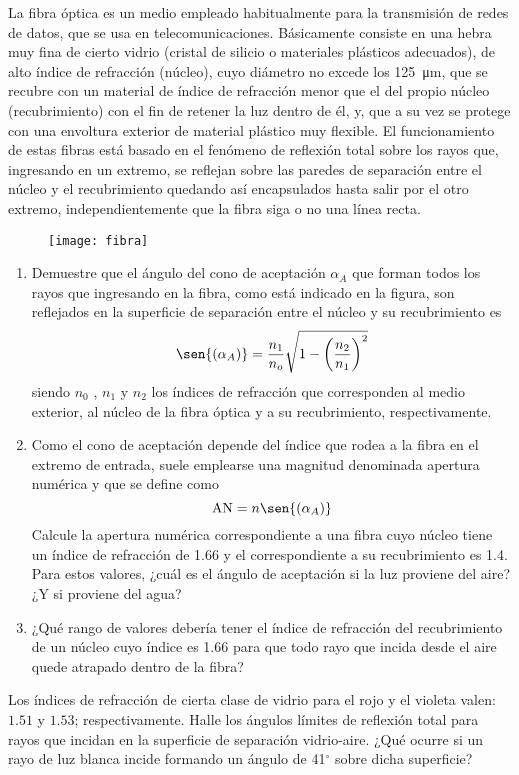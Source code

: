 \item
La fibra óptica es un medio empleado habitualmente para la transmisión de redes de datos, que se usa en telecomunicaciones.
Básicamente consiste en una hebra muy fina de cierto vidrio (cristal de silicio o materiales plásticos adecuados), de alto índice de refracción (núcleo), cuyo diámetro no excede los \SI{125}{\micro\metre}, que se recubre con un material de índice de refracción menor que el del propio núcleo (recubrimiento) con el fin de retener la luz dentro de él, y, que a su vez se protege con una envoltura exterior de material plástico muy flexible.
El funcionamiento de estas fibras está basado en el fenómeno de reflexión total sobre los rayos que, ingresando en un extremo, se reflejan sobre las paredes de separación entre el núcleo y el recubrimiento quedando así encapsulados hasta salir por el otro extremo, independientemente que la fibra siga o no una línea recta.
\begin{figure}[h]
	\centering{}\texttt{[image: fibra]}
\end{figure}
\begin{enumerate}
	\item Demuestre que el ángulo del cono de aceptación \(\alpha_A\) que forman todos los rayos que ingresando en la fibra, como está indicado en la figura, son reflejados en la superficie de separación entre el núcleo y su recubrimiento es
	\[
		\sen{(\alpha_A)} = \frac{n_1}{n_o} \sqrt{1- \left( \frac{n_2}{n_1} \right)^2 }
	\]
	siendo \(n_0\) , \(n_1\) y \(n_2\) los índices de refracción que corresponden al medio exterior, al núcleo de la fibra óptica y a su recubrimiento, respectivamente.
	\item Como el cono de aceptación depende del índice que rodea a la fibra en el extremo de entrada, suele emplearse una magnitud denominada apertura numérica y que se define como
	\[
		\text{AN} = n \sen{(\alpha_A)}
	\]
	Calcule la apertura numérica correspondiente a una fibra cuyo núcleo tiene un índice de refracción de \num{1.66} y el correspondiente a su recubrimiento es \num{1.4}.
	Para estos valores, ¿cuál es el ángulo de aceptación si la luz proviene del aire? ¿Y si proviene del agua?
	\item ¿Qué rango de valores debería tener el índice de refracción del recubrimiento de un núcleo cuyo índice es \num{1.66} para que todo rayo que incida desde el aire quede atrapado dentro de la fibra?
\end{enumerate}



\item Los índices de refracción de cierta clase de vidrio para el rojo y el violeta valen: $1.51$ y $1.53$; respectivamente.
Halle los ángulos límites de reflexión total para rayos que incidan en la superficie de separación vidrio-aire.
¿Qué ocurre si un rayo de luz blanca incide formando un ángulo de 41$^{\circ}$ sobre dicha superficie?
